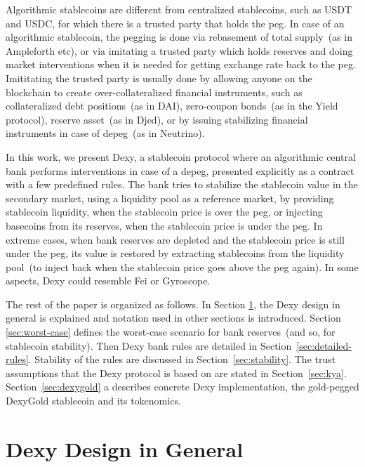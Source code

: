 \documentclass[a4paper,UKenglish,cleveref, autoref, thm-restate]{lipics-v2021}
\newcommand{\dx}{Dexy}
\begin{document}
Algorithmic stablecoins are different from centralized stablecoins, such as USDT and USDC, for which there is a trusted party that holds the peg. In case of an algorithmic stablecoin, the 
pegging is done via rebasement of total supply~(as in Ampleforth etc), or via imitating a trusted party which holds reserves and doing market interventions when it is needed for getting exchange rate back to the peg. Imititating the trusted party is usually done by allowing anyone on the blockchain to create over-collateralized financial instruments, such as collateralized debt positions~(as 
in DAI), zero-coupon bonds~(as in the Yield protocol), reserve asset~(as in Djed), or by issuing stabilizing financial instruments in case of depeg~(as in Neutrino).

In this work, we present \dx{}, a stablecoin protocol where an algorithmic central bank performs interventions in case of a depeg, presented explicitly as a contract with a few predefined rules. The bank tries to stabilize the stablecoin value in the secondary market, using a liquidity pool as a reference market, by providing stablecoin liquidity, when the stablecoin price is over the peg, or injecting basecoins from its reserves, when the stablecoin price is under the peg. In extreme cases, when bank reserves are depleted and the stablecoin price is still under the peg, its value is restored by extracting stablecoins from the liquidity pool~(to inject back when the stablecoin price goes above the peg again). In some aspects, \dx{} could resemble Fei or Gyroscope. 

The rest of the paper is organized as follows.  In Section \ref{sec:design-general}, the \dx{} design in general is explained and
notation used in other sections is introduced. Section \ref{sec:worst-case} defines the worst-case scenario for bank reserves~(and so, for stablecoin stability). Then \dx{} bank rules are detailed in Section~\ref{sec:detailed-rules}. Stability of the rules are
discussed in Section~\ref{sec:stability}. The trust assumptions that the \dx{} protocol is based on are stated in Section~\ref{sec:kya}.
Section~\ref{sec:dexygold} a describes concrete \dx{} implementation, the gold-pegged DexyGold stablecoin and its
tokenomics.

\section{\dx{} Design in General}
\label{sec:design-general}
\end{document}
